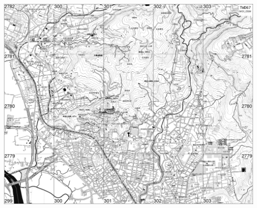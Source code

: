 \documentclass[12pt,landscape]{article}
\begin{document}
\begin{multicols}{2}

\includegraphics[width=41.46cm, height=33.16cm]{osm-map.png}

\end{multicols}
\end{document}
